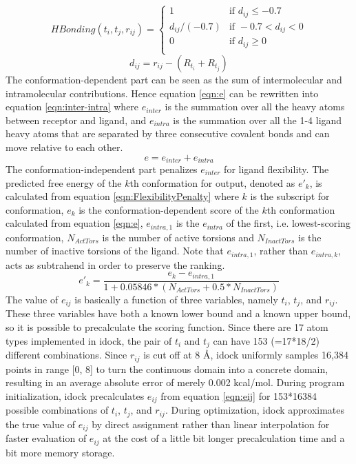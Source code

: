 \documentclass[10pt, conference, compsocconf]{IEEEtran}
\begin{document}
\begin{equation}
\label{eqn:HBonding}
HBonding(t_i, t_j, r_{ij}) =
\begin{cases}
1 & \text{if } d_{ij} \leq -0.7\\
d_{ij} / (-0.7) & \text{if } -0.7 < d_{ij} < 0\\
0 & \text{if } d_{ij} \geq 0\\
\end{cases}
\end{equation}
\begin{equation}
\label{eqn:dij}
d_{ij} = r_{ij} - (R_{t_i} + R_{t_j})
\end{equation}
The conformation-dependent part can be seen as the sum of intermolecular and intramolecular contributions. Hence equation \eqref{eqn:e} can be rewritten into equation \eqref{eqn:inter-intra} where $e_{inter}$ is the summation over all the heavy atoms between receptor and ligand, and $e_{intra}$ is the summation over all the 1-4 ligand heavy atoms that are separated by three consecutive covalent bonds and can move relative to each other.
\begin{equation}
\label{eqn:inter-intra}
e = e_{inter} + e_{intra}
\end{equation}
The conformation-independent part penalizes $e_{inter}$ for ligand flexibility. The predicted free energy of the $k$th conformation for output, denoted as $e'_k$, is calculated from equation \eqref{eqn:FlexibilityPenalty} where $k$ is the subscript for conformation, $e_k$ is the conformation-dependent score of the $k$th conformation calculated from equation \eqref{eqn:e}, $e_{intra,1}$ is the $e_{intra}$ of the first, i.e. lowest-scoring conformation, $N_{ActTors}$ is the number of active torsions and $N_{InactTors}$ is the number of inactive torsions of the ligand. Note that $e_{intra,1}$, rather than $e_{intra,k}$, acts as subtrahend in order to preserve the ranking.
\begin{equation}
\label{eqn:FlexibilityPenalty}
e'_k = \frac{e_k - e_{intra,1}}{1 + 0.05846 * (N_{ActTors} + 0.5 * N_{InactTors})}
\end{equation}
The value of $e_{ij}$ is basically a function of three variables, namely $t_i$, $t_j$, and $r_{ij}$. These three variables have both a known lower bound and a known upper bound, so it is possible to precalculate the scoring function. Since there are 17 atom types implemented in idock, the pair of $t_i$ and $t_j$ can have 153 (=17*18/2) different combinations. Since $r_{ij}$ is cut off at 8 \AA, idock uniformly samples 16,384 points in range [0, 8] to turn the continuous domain into a concrete domain, resulting in an average absolute error of merely 0.002 kcal/mol. During program initialization, idock precalculates $e_{ij}$ from equation \eqref{eqn:eij} for 153*16384 possible combinations of $t_i$, $t_j$, and $r_{ij}$. During optimization, idock approximates the true value of $e_{ij}$ by direct assignment rather than linear interpolation for faster evaluation of $e_{ij}$ at the cost of a little bit longer precalculation time and a bit more memory storage.
\end{document}
